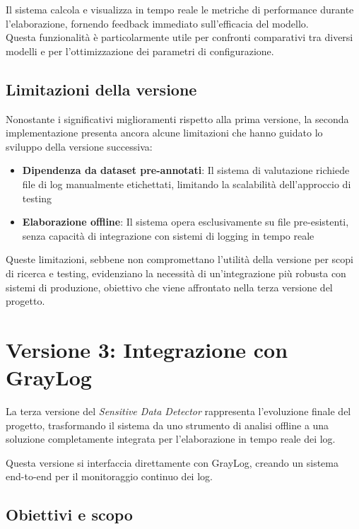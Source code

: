 \documentclass[12pt]{report}
\begin{document}
Il sistema calcola e visualizza in tempo reale le metriche di performance durante l'elaborazione, fornendo feedback immediato sull'efficacia del modello. \\
Questa funzionalità è particolarmente utile per confronti comparativi tra diversi modelli e per l'ottimizzazione dei parametri di configurazione.

\subsection{Limitazioni della versione}
\label{subsec:ver2_limitazioni}

Nonostante i significativi miglioramenti rispetto alla prima versione, la seconda implementazione presenta ancora alcune limitazioni che hanno guidato lo sviluppo della versione successiva:

\begin{itemize}
    \item \textbf{Dipendenza da dataset pre-annotati}: Il sistema di valutazione richiede file di log manualmente etichettati, limitando la scalabilità dell'approccio di testing
    \item \textbf{Elaborazione offline}: Il sistema opera esclusivamente su file pre-esistenti, senza capacità di integrazione con sistemi di logging in tempo reale
\end{itemize}

Queste limitazioni, sebbene non compromettano l'utilità della versione per scopi di ricerca e testing, evidenziano la necessità di un'integrazione più robusta con sistemi di produzione, obiettivo che viene affrontato nella terza versione del progetto.

\section{Versione 3: Integrazione con GrayLog}
\label{sec:ver3}

La terza versione del \textit{Sensitive Data Detector} rappresenta l'evoluzione finale del progetto, trasformando il sistema da uno strumento di analisi offline a una soluzione completamente integrata per l'elaborazione in tempo reale dei log.

Questa versione si interfaccia direttamente con GrayLog, creando un sistema \\
end-to-end per il monitoraggio continuo dei log.

\subsection{Obiettivi e scopo}
\label{subsec:ver3_obiettivi}
\end{document}
